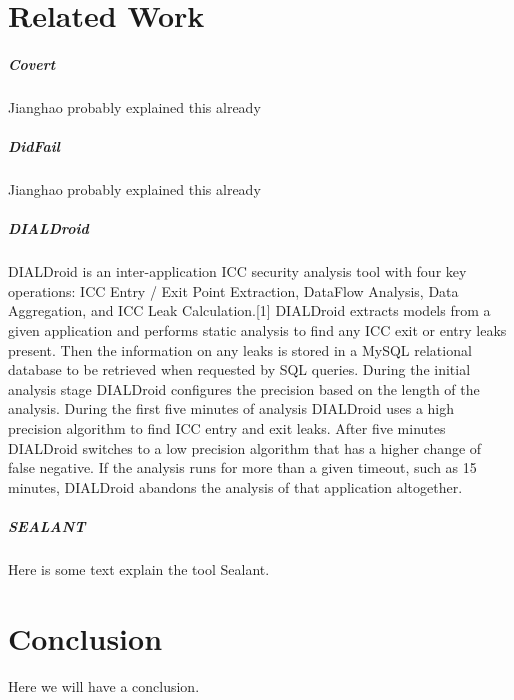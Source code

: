 \documentclass[twocolumn]{article}
\begin{document}
\section[2]{Related Work}
	
	\subparagraph{Covert}
		Jianghao probably explained this already
	\subparagraph{DidFail}
		Jianghao probably explained this already

	
	\subparagraph{DIALDroid}
		DIALDroid is an inter-application ICC security analysis tool with four key operations: ICC Entry / Exit Point Extraction, DataFlow Analysis, Data Aggregation, and ICC Leak Calculation.[1] DIALDroid extracts models from a given application and performs static analysis to find any ICC exit or entry leaks present. Then the information on any leaks is stored in a MySQL relational database to be retrieved when requested by SQL queries. During the initial analysis stage DIALDroid configures the precision based on the length of the analysis. During the first five minutes of analysis DIALDroid uses a high precision algorithm to find ICC entry and exit leaks. After five minutes DIALDroid switches to a low precision algorithm that has a higher change of false negative. If the analysis runs for more than a given timeout, such as 15 minutes, DIALDroid abandons the analysis of that application altogether.
	\subparagraph{SEALANT}
		Here is some text explain the tool Sealant.



\section[3]{Conclusion}
Here we will have a conclusion.
\end{document}
